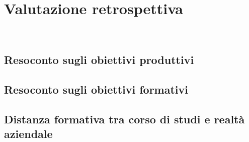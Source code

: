 
\chapter{Valutazione retrospettiva}
\label{cap:valutazione-retrospettiva}

\\

\section{Resoconto sugli obiettivi produttivi}

\section{Resoconto sugli obiettivi formativi}

\section{Distanza formativa tra corso di studi e realtà aziendale}
